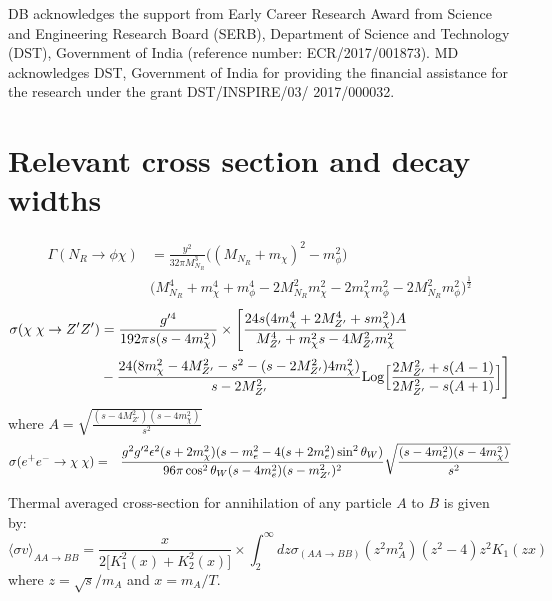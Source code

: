 \documentclass[prd,nofootinbib,preprint,superscriptaddress]{revtex4}
\begin{document}
\acknowledgements
DB acknowledges the support from Early Career Research Award from Science and Engineering Research Board (SERB), Department of Science and Technology (DST), Government of India (reference number: ECR/2017/001873). MD acknowledges DST, Government of India for providing the financial assistance for the research under the grant 
DST/INSPIRE/03/ 2017/000032.
\appendix	
\section{Relevant cross section and decay widths}	
\label{appen1}
\begin{equation}
\begin{aligned}
	\Gamma({N_R\rightarrow \phi \chi}) &= \frac{y^2}{32\pi M^3_{N_R}}\big((M_{N_R} + m_\chi)^2 - m^2_\phi \big)\\
	&\big( M^4_{N_R} + m^4_\chi + m^4_\phi - 2 M^2_{N_R} m^2_{\chi} - 2 m^2_\chi m^2_\phi - 2 M^2_{N_R} m^2_\phi \big)^{\frac{1}{2}}
\end{aligned}
\end{equation}
\begin{equation}
\begin{aligned}		
	\sigma({\rm \chi \;\chi} \rightarrow Z' Z') &= \frac{g'^4}{192 \pi s (s-4m^2_{\chi})} \times \Bigg[\frac{24s(4m^4_{\chi}+2M^4_{Z'}+sm^2_{\chi})A}{M^4_{Z'}+m^2_{\chi}s-4M^2_{Z'}m^2_{\chi}}\\ & -\frac{24 (8m^2_{\chi}-4M^2_{Z'}-s^2-(s-2M^2_{Z'})4m^2_{\chi})}{s-2M^2_{Z'}} {\rm Log}\Big[\frac{2M^2_{Z'}+s(A-1)}{2M^2_{Z'}-s(A+1)}\Big]\Bigg]
\end{aligned}
\end{equation}
where $A=\sqrt{\frac{(s-4M^2_{Z'})(s-4m^2_{\chi})}{s^2}}$
\begin{eqnarray}
\sigma( e^{+} e^{-} \rightarrow {\rm \chi \;\chi})&=& \frac{g^2 g'^2 \epsilon^2(s+2m^2_{\chi})(s-m^2_e-4(s+2m^2_e)\sin^2\theta_{W})}{96 \pi \cos^2\theta_{W}(s-4m^2_e)(s-m^2_{Z'})^2}\sqrt{\frac{(s-4m^2_e)(s-4m^2_{\chi})}{s^2}} \nonumber \\
\end{eqnarray}	

Thermal averaged cross-section for annihilation of any particle $A$ to $B$  is given by: \cite{Gondolo:1990dk}
\begin{equation}
\langle\sigma v \rangle_{AA \rightarrow BB} = \frac{x}{2\big[K^2_1(x)+K^2_2(x)\big]}\times \int^{\infty}_{2}  dz \sigma_{(AA\rightarrow BB)} (z^2 m^2_A) (z^2 - 4)z^2 K_1(zx)
\label{appeneq1}
\end{equation}
where $z=\sqrt{s}/m_A$ and $x=m_A/T$.
\end{document}
